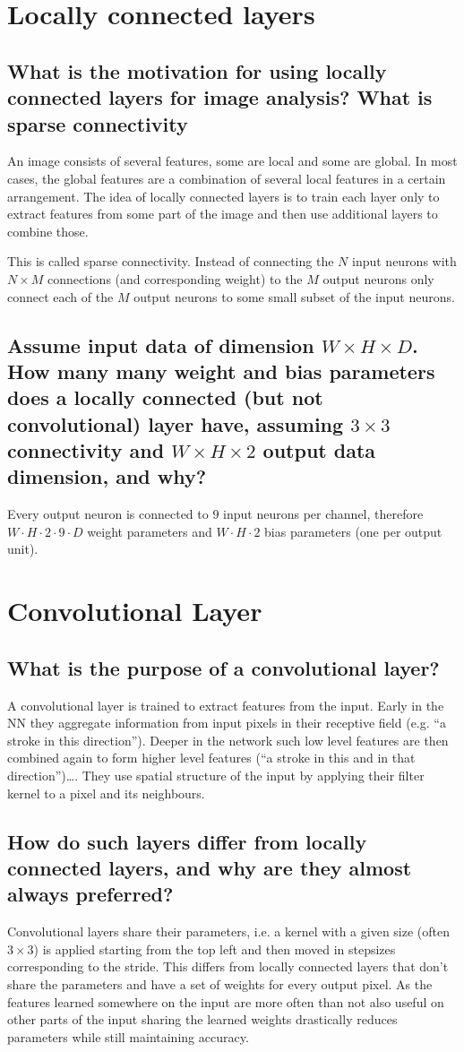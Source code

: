 \section{Locally connected layers}
\subsection{What is the motivation for using locally connected layers for image analysis? What is sparse connectivity}
An image consists of several features, some are local and some are global. In most cases, the global features are a combination of several local features in a certain arrangement.
The idea of locally connected layers is to train each layer only to extract features from some part of the image and then use additional layers to combine those. 

This is called sparse connectivity. Instead of connecting the $N$ input neurons with $N\times M$ connections (and corresponding weight) to the $M$ output neurons only connect each of the $M$ output neurons to some small subset of the input neurons. 
\subsection{Assume input data of dimension $W \times H \times D$. How many many weight and bias parameters does a locally connected (but not convolutional) layer have, assuming $3 \times 3$ connectivity and $W \times H \times 2$ output data dimension, and why?}
Every output neuron is connected to $9$ input neurons per channel, therefore $W\cdot H\cdot 2 \cdot 9 \cdot D$ weight parameters and $W\cdot H\cdot2$ bias parameters (one per output unit).
%
\section{Convolutional Layer}
\subsection{What is the purpose of a convolutional layer?}
A convolutional layer is trained to extract features from the input. Early in the NN they aggregate information from input pixels in their receptive field (e.g. ``a stroke in this direction''). Deeper in the network such low level features are then combined again to form higher level features (``a stroke in this and in that direction'')\ldots.
They use spatial structure of the input by applying their filter kernel to a pixel and its neighbours. 
\subsection{How do such layers differ from locally connected layers, and why are they almost always preferred?}
Convolutional layers share their parameters, i.e. a kernel with a given size (often $3\times 3$) is applied starting from the top left and then moved in stepsizes corresponding to the stride. 
This differs from locally connected layers that don't share the parameters and have a set of weights for every output pixel.  As the features learned somewhere on the input are more often than not also useful on other parts of the input sharing the learned weights drastically reduces parameters while still maintaining accuracy.
